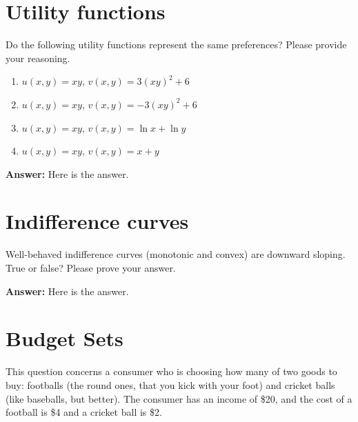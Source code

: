 \documentclass[12pt,a4paper]{article}
\begin{document}
\maketitle

\section{Utility functions}
Do the following utility functions represent the same preferences? Please provide your reasoning.

\begin{enumerate}[label=(\alph*)]
  \item $u(x,y)=xy$, \quad $v(x,y)=3(xy)^2+6$
  \item $u(x,y)=xy$, \quad $v(x,y)=-3(xy)^2+6$
  \item $u(x,y)=xy$, \quad $v(x,y)=\ln x+\ln y$
  \item $u(x,y)=xy$, \quad $v(x,y)=x+y$
\end{enumerate}

\vspace{0.5cm}

\noindent\textbf{Answer:} Here is the answer.

\section{Indifference curves}
Well-behaved indifference curves (monotonic and convex) are downward sloping. True or false? Please prove your answer.

\vspace{0.5cm}

\noindent\textbf{Answer:} Here is the answer.

\section{Budget Sets}
This question concerns a consumer who is choosing how many of two goods to buy: footballs (the round ones, that you kick with your foot) and cricket balls (like baseballs, but better). The consumer has an income of \$20, and the cost of a football is \$4 and a cricket ball is \$2.
\end{document}
